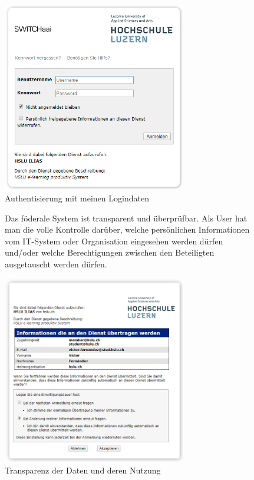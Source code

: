 \documentclass[10pt,a4paper]{article}
\begin{document}
\begin{figure}[H]
    \begin{center}
    \includegraphics[width=8cm]{images/switchaai2.png}
    \caption{Authentisierung mit meinen Logindaten}
    \label{switchaai2}
    \end{center}
\end{figure}

\begin{figure}[H]
    Das föderale System ist transparent und überprüfbar. Als User hat man die volle Kontrolle darüber, welche persönlichen Informationen vom IT-System oder Organisation eingesehen werden dürfen und/oder welche Berechtigungen zwischen den Beteiligten ausgetauscht werden dürfen.
    \begin{center}
    \includegraphics[width=8cm]{images/switchaai3.png}
    \caption{Transparenz der Daten und deren Nutzung}
    \label{switchaai3}
    \end{center}
\end{figure}
\end{document}
